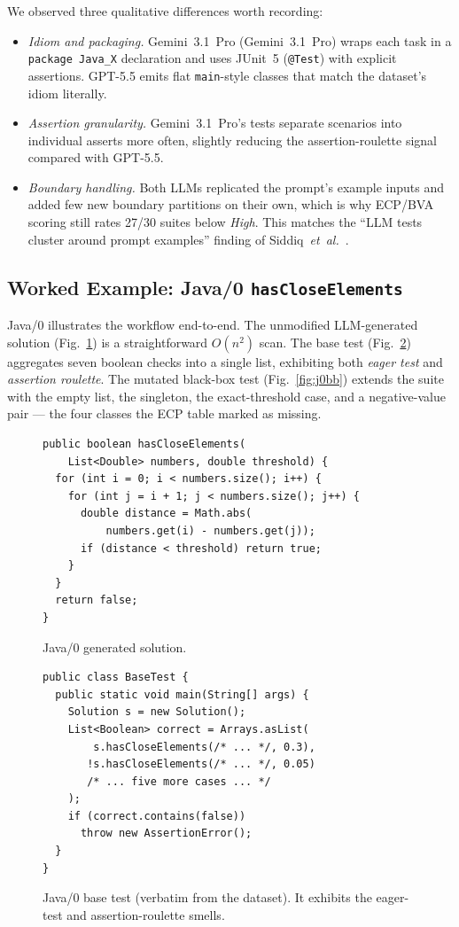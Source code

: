 \documentclass[journal]{IEEEtran}
\begin{document}
We observed three qualitative differences worth recording:
\begin{itemize}
    \item \emph{Idiom and packaging.} Gemini~3.1~Pro (Gemini~3.1~Pro)
    wraps each task in a \texttt{package Java\_X}
    declaration and uses JUnit~5 (\texttt{@Test}) with
    explicit assertions. GPT-5.5 emits flat \texttt{main}-style
    classes that match the dataset's idiom literally.
    \item \emph{Assertion granularity.} Gemini~3.1~Pro's tests
    separate scenarios into individual asserts more often,
    slightly reducing the assertion-roulette signal compared
    with GPT-5.5.
    \item \emph{Boundary handling.} Both LLMs replicated the
    prompt's example inputs and added few new boundary
    partitions on their own, which is why ECP/BVA scoring
    still rates 27/30 suites below \emph{High}. This matches
    the ``LLM tests cluster around prompt examples'' finding
    of Siddiq~\emph{et~al.}~\cite{siddiq2024junit}.
\end{itemize}

\subsection{Worked Example: Java/0 \texttt{hasCloseElements}}
Java/0 illustrates the workflow end-to-end. The unmodified
LLM-generated solution
(Fig.~\ref{fig:j0sol}) is a straightforward $O(n^{2})$ scan.
The base test (Fig.~\ref{fig:j0base}) aggregates seven boolean
checks into a single list, exhibiting both \emph{eager test}
and \emph{assertion roulette}. The mutated black-box test
(Fig.~\ref{fig:j0bb}) extends the suite with the empty list,
the singleton, the exact-threshold case, and a negative-value
pair --- the four classes the ECP table marked as missing.

\begin{figure}[!t]
\begin{lstlisting}
public boolean hasCloseElements(
    List<Double> numbers, double threshold) {
  for (int i = 0; i < numbers.size(); i++) {
    for (int j = i + 1; j < numbers.size(); j++) {
      double distance = Math.abs(
          numbers.get(i) - numbers.get(j));
      if (distance < threshold) return true;
    }
  }
  return false;
}
\end{lstlisting}
\caption{Java/0 generated solution.}
\label{fig:j0sol}
\end{figure}

\begin{figure}[!t]
\begin{lstlisting}
public class BaseTest {
  public static void main(String[] args) {
    Solution s = new Solution();
    List<Boolean> correct = Arrays.asList(
        s.hasCloseElements(/* ... */, 0.3),
       !s.hasCloseElements(/* ... */, 0.05)
       /* ... five more cases ... */
    );
    if (correct.contains(false))
      throw new AssertionError();
  }
}
\end{lstlisting}
\caption{Java/0 base test (verbatim from the dataset). It
exhibits the eager-test and assertion-roulette smells.}
\label{fig:j0base}
\end{figure}
\end{document}

